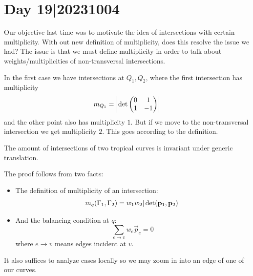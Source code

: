 \documentclass[12pt]{memoir}
\begin{document}
\section{Day 19|20231004}
Our objective last time was to motivate the idea of intersections with certain multiplicity. With out new definition of multiplicity, does this resolve the issue we had?  The issue is that we must define multiplicity in order to talk about weights/multiplicities of non-transversal intersections.

\begin{Ex}
 
In the first case we have intersections at $Q_1,Q_2$, where the first intersection has multiplicity
$$m_{Q_1}=\left|\det\begin{pmatrix} 0 & 1 \\ 1 & -1 \end{pmatrix}\right|$$
and the other point also has multiplicity $1$. But if we move to the non-transversal intersection we get multiplicity $2$. This goes according to the definition. 
\end{Ex}

\begin{Lem}
The amount of intersections of two tropical curves is invariant under generic translation.
\end{Lem}

The proof follows from two facts:

\begin{itemize}
    \item The definition of multiplicity of an intersection:
    $$m_q(\Gamma_1,\Gamma_2)=w_1w_2|\det(\mathbf{p}_1,\mathbf{p}_2)|$$
    \item And the balancing condition at $q$: 
    $$\sum_{e\to v}w_e\vec{p}_e=0$$
    where $e\to v$ means edges incident at $v$.
\end{itemize}

It also suffices to analyze cases locally so we may zoom in into an edge of one of our curves.
\end{document}
